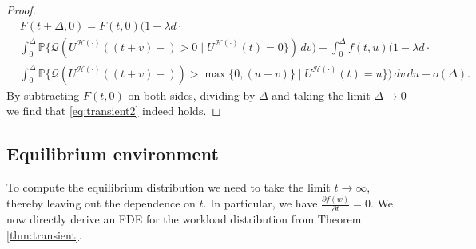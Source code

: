 \documentclass[12pt]{report}
\renewcommand{\P}{\mathbb{P}}
\newcommand{\QQ}{\mathcal{Q}}
\renewcommand{\P}{\mathbb{P}}
\begin{document}
\begin{proof}
\begin{align*}
&F(t+\Delta, 0) = F(t,0) \bigg(1-\lambda d \cdot \\
& \int_0^{\Delta} \P\{\QQ(U^{\mathcal{H}(\cdot)}((t+v)-)>0 \mid U^{\mathcal{H}(\cdot)}(t)=0\})\, dv \bigg) + \int_0^\Delta f(t, u) \bigg(1-\lambda d \cdot \\
& \int_0^\Delta \mathbb{P}\{ \mathcal{Q}(U^{\mathcal{H}(\cdot)}((t+v)-)) > \max\{0,(u-v)\} \mid U^{\mathcal{H}(\cdot)}(t)=u \}\bigg) \, dv \, du +o(\Delta).
\end{align*}
By subtracting $F(t,0)$ on both sides, dividing by $\Delta$ and taking the limit $\Delta \rightarrow 0$ we find that \eqref{eq:transient2} indeed holds.
\end{proof}

\subsection{Equilibrium environment}\label{sec:equil}
To compute the equilibrium distribution we need to take the limit $t\rightarrow \infty$, thereby leaving out the dependence on $t$. In particular, we have $\frac{\partial f(w)}{\partial t} = 0$. We now directly derive an FDE for the workload distribution from Theorem \ref{thm:transient}.
\end{document}
